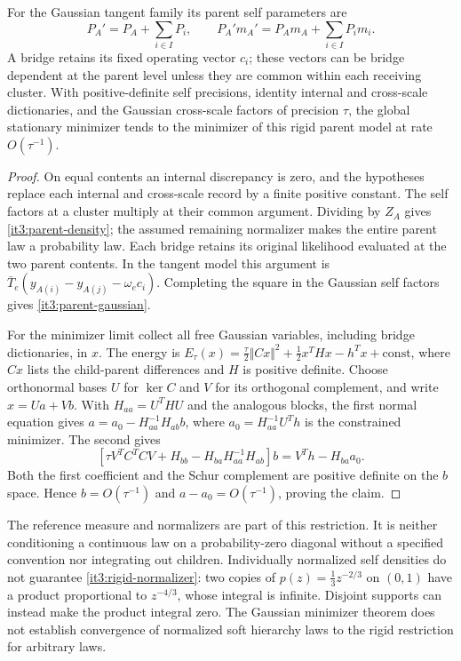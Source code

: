 \documentclass[11pt,letterpaper]{report}
\begin{document}
For the Gaussian tangent family its parent self parameters are
\begin{equation}
P_A'=P_A+\sum_{i\in I}P_i,\qquad
P_A'm_A'=P_Am_A+\sum_{i\in I}P_im_i.
\label{it3:parent-gaussian}
\end{equation}
A bridge retains its fixed operating vector $c_i$; these vectors can be bridge dependent at the parent level unless they are common within each receiving cluster. With positive-definite self precisions, identity internal and cross-scale dictionaries, and the Gaussian cross-scale factors of precision $\tau$, the global stationary minimizer tends to the minimizer of this rigid parent model at rate $O(\tau^{-1})$.
\begin{proof}
On equal contents an internal discrepancy is zero, and the hypotheses replace each internal and cross-scale record by a finite positive constant. The self factors at a cluster multiply at their common argument. Dividing by $Z_A$ gives \cref{it3:parent-density}; the assumed remaining normalizer makes the entire parent law a probability law. Each bridge retains its original likelihood evaluated at the two parent contents. In the tangent model this argument is $\bar T_e(y_{A(i)}-y_{A(j)}-\omega_ec_i)$. Completing the square in the Gaussian self factors gives \cref{it3:parent-gaussian}.

For the minimizer limit collect all free Gaussian variables, including bridge dictionaries, in $x$. The energy is
$E_\tau(x)=\frac{\tau}{2}\Vert Cx\Vert^2+\frac12x^THx-h^Tx+\mathrm{const}$,
where $Cx$ lists the child-parent differences and $H$ is positive definite. Choose orthonormal bases $U$ for $\ker C$ and $V$ for its orthogonal complement, and write $x=Ua+Vb$. With $H_{aa}=U^THU$ and the analogous blocks, the first normal equation gives
$a=a_0-H_{aa}^{-1}H_{ab}b$, where $a_0=H_{aa}^{-1}U^Th$ is the constrained minimizer. The second gives
\begin{equation}
\left[\tau V^TC^TCV+H_{bb}-H_{ba}H_{aa}^{-1}H_{ab}\right]b
=V^Th-H_{ba}a_0.
\end{equation}
Both the first coefficient and the Schur complement are positive definite on the $b$ space. Hence $b=O(\tau^{-1})$ and $a-a_0=O(\tau^{-1})$, proving the claim.
\end{proof}

The reference measure and normalizers are part of this restriction. It is neither conditioning a continuous law on a probability-zero diagonal without a specified convention nor integrating out children. Individually normalized self densities do not guarantee \cref{it3:rigid-normalizer}: two copies of $p(z)=\frac13z^{-2/3}$ on $(0,1)$ have a product proportional to $z^{-4/3}$, whose integral is infinite. Disjoint supports can instead make the product integral zero. The Gaussian minimizer theorem does not establish convergence of normalized soft hierarchy laws to the rigid restriction for arbitrary laws.
\end{document}
